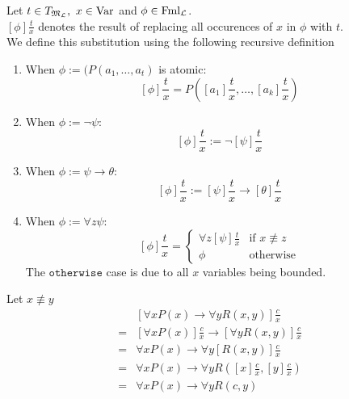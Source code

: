 \documentclass[11pt,a4paper]{article}
\begin{document}
Let $t\in T_{\M_\LL},\ x\in\text{Var}$ and $\phi\in\text{Fml}_{\mathcal{L}}$.\\
$[\phi]\frac{t}x$ denotes the result of replacing all occurences of $x$ in $\phi$ with $t$.\\
We define this substitution using the following recursive definition
\begin{enumerate}
	\item When $\phi:=(P(a_1,\dots,a_t)$ is atomic:
	$$[\phi]\frac{t}x=P\left([a_1]\frac{t}x,\dots,[a_k]\frac{t}x\right)$$
	\item When $\phi:=\neg\psi$:
	$$[\phi]\frac{t}x:=\neg[\psi]\frac{t}x$$
	\item When $\phi:=\psi\to\theta$:
	$$[\phi]\frac{t}x:=[\psi]\frac{t}x\to[\theta]\frac{t}x$$
	\item When $\phi:=\forall z\psi$:
	$$[\phi]\frac{t}x=\begin{cases}\forall z[\psi]\frac{t}x&\text{if }x\not\equiv z\\\phi&\text{otherwise}\end{cases}$$
	\nb The $\mathtt{otherwise}$ case is due to all $x$ variables being bounded.
\end{enumerate}

Let $x\not\equiv y$
\[\begin{array}{rl}
&[\forall xP(x)\to\forall yR(x,y)]\frac{c}x\\
=&[\forall xP(x)]\frac{c}x\to[\forall yR(x,y)]\frac{c}x\\
=&\forall xP(x)\to\forall y[R(x,y)]\frac{c}x\\
=&\forall xP(x)\to\forall yR([x]\frac{c}x,[y]\frac{c}x)\\
=&\forall xP(x)\to\forall yR(c,y)
\end{array}\]
\end{document}

